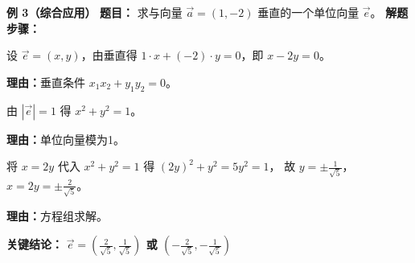 \begin{examplebox}
	\medskip
	\textbf{\textcolor{CExample}{例 3（综合应用）}}
	\textbf{\textcolor{CExample}{题目：}}
	求与向量 $\vec{a}=(1,-2)$ 垂直的一个单位向量 $\vec{e}$。
	\textbf{\textcolor{CExample}{解题步骤：}}
	\begin{description}[style=nextline, leftmargin=2.8em, labelsep=0.5em, itemsep=0.45em]
		\item[\textbf{第一步（设向量列方程）：}]
			设 $\vec{e}=(x,y)$，由垂直得 $1\cdot x + (-2)\cdot y = 0$，即 $x-2y=0$。
			\par\textbf{理由：}垂直条件 $x_1x_2+y_1y_2=0$。
		\item[\textbf{第二步（单位条件）：}]
			由 $|\vec{e}|=1$ 得 $x^2+y^2=1$。
			\par\textbf{理由：}单位向量模为1。
		\item[\textbf{第三步（联立求解）：}]
			将 $x=2y$ 代入 $x^2+y^2=1$ 得 $(2y)^2+y^2=5y^2=1$， 故 $y=\pm\frac{1}{\sqrt5}$，$x=2y=\pm\frac{2}{\sqrt5}$。
			\par\textbf{理由：}方程组求解。
	\end{description}
	\textbf{\textcolor{CExample}{关键结论：}}
	\textbf{$\vec{e}=\left(\frac{2}{\sqrt5},\frac{1}{\sqrt5}\right)$ 或 $\left(-\frac{2}{\sqrt5},-\frac{1}{\sqrt5}\right)$}
\end{examplebox}
